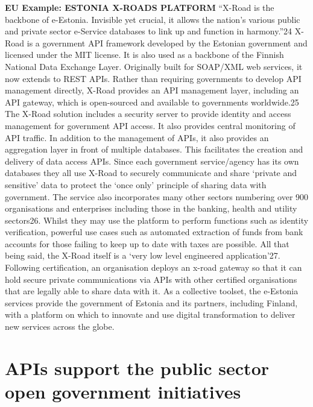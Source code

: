 \textbf{EU Example: ESTONIA X-ROADS PLATFORM}
“X-Road is the backbone of e-Estonia. Invisible yet crucial, it allows the nation’s various public and
private sector e-Service databases to link up and function in harmony.”24
X-Road is a government API framework developed by the Estonian government and licensed
under the MIT license. It is also used as a backbone of the Finnish National Data Exchange Layer.
Originally built for SOAP/XML web services, it now extends to REST APIs. Rather than requiring
governments to develop API management directly, X-Road provides an API management layer,
including an API gateway, which is open-sourced and available to governments worldwide.25
The X-Road solution includes a security server to provide identity and access management for
government API access. It also provides central monitoring of API traffic. In addition to the
management of APIs, it also provides an aggregation layer in front of multiple databases. This
facilitates the creation and delivery of data access APIs.
Since each government service/agency has its own databases they all use X-Road to securely
communicate and share ‘private and sensitive’ data to protect the ‘once only’ principle of sharing
data with government. The service also incorporates many other sectors numbering over 900
organisations and enterprises including those in the banking, health and utility sectors26. Whilst
they may use the platform to perform functions such as identity verification, powerful use cases
such as automated extraction of funds from bank accounts for those failing to keep up to date with
taxes are possible.
All that being said, the X-Road itself is a ‘very low level engineered application’27. Following
certification, an organisation deploys an x-road gateway so that it can hold secure private
communications via APIs with other certified organisations that are legally able to share data with
it. As a collective toolset, the e-Estonia services provide the government of Estonia and its
partners, including Finland, with a platform on which to innovate and use digital transformation to
deliver new services across the globe.

\section{APIs support the public sector open government initiatives}

